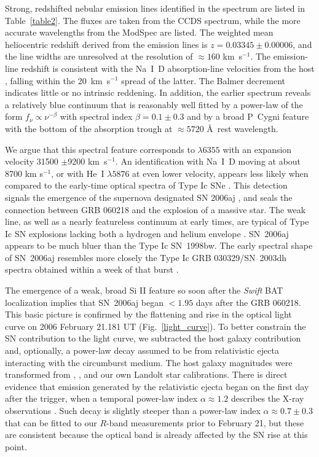 \documentclass[apj]{emulateapj}
\begin{document}
Strong, redshifted nebular emission
lines identified in the spectrum are 
listed in Table~\ref{table2}.  The fluxes
are taken from the CCDS spectrum, while
the more accurate wavelengths from the
ModSpec are listed.
The weighted mean heliocentric redshift derived from the emission lines is 
$z=0.03345 \pm 0.00006$, and the line widths are unresolved at the
resolution of $\approx 160$ km~s$^{-1}$.  The emission-line redshift
is consistent with the Na~I~D absorption-line velocities from the host
\citep{guenther}, falling within the 20~km~s$^{-1}$ spread of the latter.
The Balmer decrement indicates little or no
intrinsic reddening.  
In addition, the earlier spectrum reveals a 
relatively blue continuum that
is reasonably well fitted by a power-law of the form $f
_{\nu} \propto 
\nu^{-\beta}$ with spectral index $\beta = 0.1 \pm 0.3$  
and by a broad P~Cygni feature with the bottom of the 
absorption trough at $\approx 5720$ \AA\ rest wavelength.

We argue that this spectral feature corresponds to 
 $\lambda 6355$ 
with an expansion velocity 31500 $\pm $9200 km~s$^{-1}$. 
An identification with Na~I~D moving at about 8700 km s$^{-1}$,
or with He~I $\lambda 5876$ at even lower velocity,
appears less likely when compared to the early-time optical spectra
of Type Ic SNe \citep{patat}. 
This detection signals the emergence of the supernova designated SN
2006aj \citep{masetti,soderberg,fugazza,
mirabal3,fatkhullin,mazzali,modjaz},
and seals the connection between GRB 060218 and 
the explosion of a massive star.
The weak  line, as well as a nearly featureless
continuum at early times, are typical of Type Ic SN explosions lacking 
both a hydrogen and helium envelope \citep[e.g.][]{filippenko}. SN~2006aj appears to
be much bluer than the Type Ic SN~1998bw.
The early spectral shape of SN~2006aj resembles more closely 
the Type Ic GRB 030329/SN~2003dh spectra obtained within a week 
of that burst \citep{stanek,hjorth}. 

The emergence of a weak, broad Si II feature so
soon after the {\it Swift\/} BAT localization implies that SN~2006aj
began $< 1.95$ days after the GRB 060218. 
This basic picture is confirmed
by the flattening and rise in the optical light curve
on 2006 February 21.181 UT (Fig.~\ref{light_curve}). To better
constrain the SN contribution to the light curve,
we subtracted the host galaxy contribution and, optionally,
a power-law decay assumed to be from relativistic ejecta interacting 
with the circumburst medium.
The host galaxy magnitudes were transformed
from \citet{cool}, \citet{adelman}, and our own Landolt star calibrations.
There is direct evidence 
that emission generated by the relativistic
ejecta began on the first day after the trigger,
when a temporal power-law index $\alpha \approx 1.2$ describes 
the X-ray observations \citep{cusumano2}.
Such decay is slightly steeper than a power-law index  
$\alpha \approx 0.7 \pm 0.3$ that can be fitted to our $R$-band measurements
prior to February 21, but these are consistent because the optical band is 
already affected by the SN rise at this point.
\end{document}
